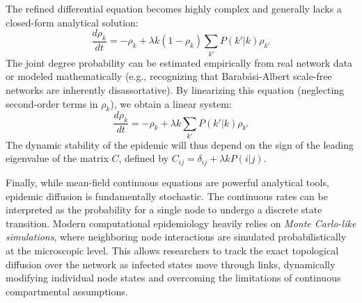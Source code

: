 The refined differential equation becomes highly complex and generally lacks a closed-form analytical solution:
\[
    \frac{d\rho_k}{dt} = -\rho_k + \lambda k (1 - \rho_k) \sum_{k'} P(k'|k)\rho_{k'}
\]
The joint degree probability can be estimated empirically from real network data or modeled mathematically (e.g., recognizing that Barabási-Albert scale-free networks are inherently disassortative). By linearizing this equation (neglecting second-order terms in \(\rho_k\)), we obtain a linear system:
\[
    \frac{d\rho_k}{dt} = -\rho_k + \lambda k \sum_{k'} P(k'|k)\rho_{k'}
\]
The dynamic stability of the epidemic will thus depend on the sign of the leading eigenvalue of the matrix \(C\), defined by \(C_{ij} = \delta_{ij} + \lambda k P(i|j)\).

Finally, while mean-field continuous equations are powerful analytical tools, epidemic diffusion is fundamentally stochastic. The continuous rates can be interpreted as the probability for a single node to undergo a discrete state transition. Modern computational epidemiology heavily relies on \textit{Monte Carlo-like simulations}, where neighboring node interactions are simulated probabilistically at the microscopic level. This allows researchers to track the exact topological diffusion over the network as infected states move through links, dynamically modifying individual node states and overcoming the limitations of continuous compartmental assumptions.